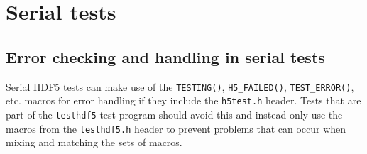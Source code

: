 \documentclass[../HDF5_RFC.tex]{subfiles}
\begin{document}
\section{Serial tests}
\label{serial}

\subsection{Error checking and handling in serial tests}

Serial HDF5 tests can make use of the \texttt{TESTING()}, \texttt{H5\_FAILED()}, \texttt{TEST\_ERROR()},
etc. macros for error handling if they include the \texttt{h5test.h} header. Tests that are part of the \texttt{testhdf5} test program should avoid this and instead only use the macros from the
\texttt{testhdf5.h} header to prevent problems that can occur when mixing and matching the sets of macros.
\end{document}
